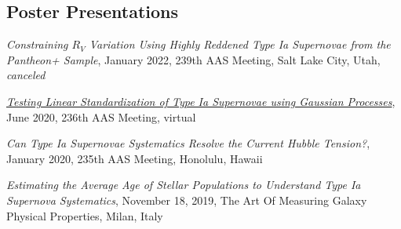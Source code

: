 \documentclass[margin]{res}
\begin{document}
\begin{resume}





\section{Poster Presentations}
\hangindent=15pt 
{\sl Constraining $R_V$ Variation Using Highly Reddened Type Ia Supernovae from the Pantheon+ Sample}, January 2022, 239th AAS Meeting, Salt Lake City, Utah, \textit{canceled}
\vspace{-12pt}


\hangindent=15pt 
\href{https://aas236-aas.ipostersessions.com/default.aspx?s=02-A5-6C-28-27-98-74-49-ED-38-21-BF-C2-85-DA-39}{\sl Testing Linear Standardization of Type Ia Supernovae using Gaussian Processes}, June 2020, 236th AAS Meeting, virtual
\vspace{-12pt}

\hangindent=15pt 
{\sl Can Type Ia Supernovae Systematics Resolve the Current Hubble Tension?}, January 2020, 235th AAS Meeting, Honolulu, Hawaii
\vspace{-12pt}

\hangindent=15pt 
{\sl Estimating the Average Age of Stellar Populations to Understand Type Ia Supernova Systematics}, November 18, 2019, The Art Of Measuring Galaxy Physical Properties, Milan, Italy
\vspace{-12pt}
\vspace{-12pt}


\end{resume}
\end{document}
